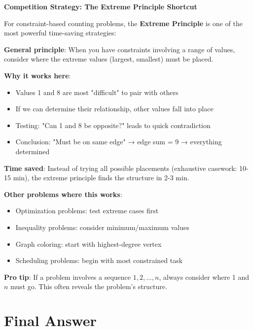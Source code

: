 \documentclass[]{article}
\begin{document}
\begin{tipbox}
\textbf{Competition Strategy: The Extreme Principle Shortcut}

For constraint-based counting problems, the \textbf{Extreme Principle} is one of the most powerful time-saving strategies:

\textbf{General principle}: When you have constraints involving a range of values, consider where the extreme values (largest, smallest) must be placed.

\textbf{Why it works here}:
\begin{itemize}[nosep]
    \item Values 1 and 8 are most "difficult" to pair with others
    \item If we can determine their relationship, other values fall into place
    \item Testing: "Can 1 and 8 be opposite?" leads to quick contradiction
    \item Conclusion: "Must be on same edge" → edge sum = 9 → everything determined
\end{itemize}

\textbf{Time saved}: Instead of trying all possible placements (exhaustive casework: 10-15 min), the extreme principle finds the structure in 2-3 min.

\textbf{Other problems where this works}:
\begin{itemize}[nosep]
    \item Optimization problems: test extreme cases first
    \item Inequality problems: consider minimum/maximum values
    \item Graph coloring: start with highest-degree vertex
    \item Scheduling problems: begin with most constrained task
\end{itemize}

\textbf{Pro tip}: If a problem involves a sequence $1, 2, \ldots, n$, always consider where 1 and $n$ must go. This often reveals the problem's structure.
\end{tipbox}

\section*{Final Answer}
\end{document}
